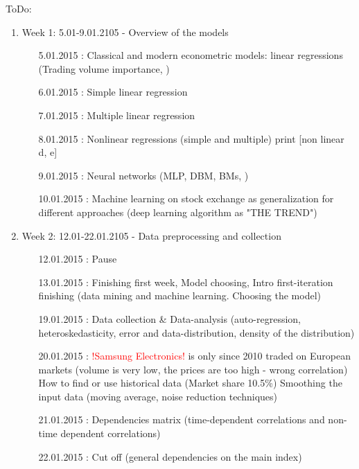 \documentclass {article}
\begin{document}
ToDo:
\begin{enumerate}
	\item Week 1: 5.01-9.01.2105 - Overview of the models 
	\begin{enumerate}
		\item[5.01.2015]: Classical and modern econometric models:  linear regressions (Trading volume importance, ) 
		\item[6.01.2015]: Simple linear regression 	 		  
		\item[7.01.2015]: Multiple linear regression  
		\item[8.01.2015]: Nonlinear regressions (simple and multiple) print [non linear d, e]  
		\item[9.01.2015]: Neural networks (MLP, DBM, BMs, )
		\item[10.01.2015]: Machine learning on stock exchange as generalization for different approaches (deep learning algorithm as "THE TREND") 
	\end{enumerate}
	\item Week 2: 12.01-22.01.2105 - Data preprocessing and collection
	\begin{enumerate}
		\item[12.01.2015]: Pause  
		\item[13.01.2015]: Finishing first week, Model choosing, Intro first-iteration finishing (data mining and machine learning. Choosing the model)  
		\item[19.01.2015]: Data collection  \& Data-analysis (auto-regression, heteroskedasticity, error and data-distribution, density of the distribution)
		\item[20.01.2015]: \textcolor{red}{!Samsung Electronics!} is only since 2010 traded on European markets (volume is very low, the prices are too high - wrong correlation) How to find or use historical data (Market share 10.5\%)
		Smoothing the input data (moving average, noise reduction techniques)
		\item[21.01.2015]: Dependencies matrix  (time-dependent correlations and non-time dependent correlations)
		\item[22.01.2015]: Cut off (general dependencies on the main index)
		

\end{enumerate}
\end{enumerate}
\end{document}
